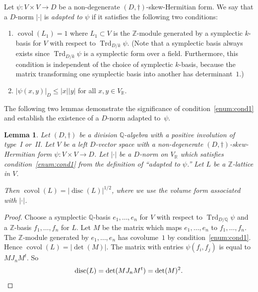 \documentclass[JEP,XML,SOM,Unicode,NoFloatCountersInSection]{cedram}
\newcommand{\bQ}{\mathbb{Q}}
\newcommand{\bR}{\mathbb{R}}
\newcommand{\bZ}{\mathbb{Z}}
\DeclareMathOperator{\covol}{covol}
\DeclareMathOperator{\disc}{disc}
\DeclareMathOperator{\Trd}{Trd}
\newcommand{\abs}[1]{\lvert #1 \rvert}
\newcommand{\defterm}[1]{\emph{#1}}
\newtheorem{lemma}{Lemma}[section]
\begin{document}
Let $\psi \colon V \times V \to D$ be a non-degenerate $(D,\dag)$-skew-Hermitian form.
We say that a $D$-norm $\abs{\cdot}$ is \defterm{adapted to $\psi$} if it satisfies the following two conditions:
\begin{enumerate}
\item\label{enum:cond1} $\covol(L_1) = 1$ where $L_1 \subset V$ is the $\bZ$-module generated by a symplectic $k$-basis for $V$ with respect to $\Trd_{D/k} \psi$.
(Note that a symplectic basis always exists since $\Trd_{D/k} \psi$ is a symplectic form over a field. Furthermore, this condition is independent of the choice of symplectic $k$-basis, because the matrix transforming one symplectic basis into another has determinant~$1$.)
\item\label{enum:cond2} $\abs{\psi(x, y)}_D \leq \abs{x} \abs{y}$ for all $x, y \in V_\bR$.
\end{enumerate}

The following two lemmas demonstrate the significance of condition~\eqref{enum:cond1} and establish the existence of a $D$-norm adapted to~$\psi$.

\begin{lemma} \label{covol-disc-lattice}
Let $(D,\dag)$ be a division $\bQ$-algebra with a positive involution of type~I or~II.
Let $V$ be a left $D$-vector space with a non-degenerate $(D,\dag)$-skew-Hermitian form $\psi \colon V \times V \to D$.
Let $\abs{\cdot}$ be a $D$-norm on $V_\bR$ which satisfies condition~\eqref{enum:cond1} from the definition of ``adapted to $\psi$.''
Let $L$ be a $\bZ$-lattice in $V$.

Then $\covol(L) = \abs{\disc(L)}^{1/2}$, where we use the volume form associated with $\abs{\cdot}$.
\end{lemma}

\begin{proof}
Choose a symplectic $\bQ$-basis $e_1, \dotsc, e_n$ for $V$ with respect to $\Trd_{D/\bQ} \psi$ and a $\bZ$-basis $f_1, \dotsc, f_n$ for $L$.
Let $M$ be the matrix which maps $e_1, \dotsc, e_n$ to $f_1, \dotsc, f_n$.
The $\bZ$-module generated by $e_1, \dotsc, e_n$ has covolume~$1$ by condition~\eqref{enum:cond1}.
Hence $\covol(L) = \abs{\det(M)}$.
The matrix with entries $\psi(f_i, f_j)$ is equal to $MJ_nM^t$. So
\[
\disc(L) = \det(MJ_nM^t) = \det(M)^2.
\qedhere
\]
\end{proof}
\end{document}
